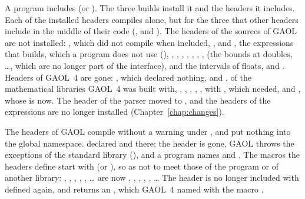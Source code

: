 A program includes  (or ). The three builds
install it and the headers it includes. Each of the installed
headers compiles alone, but for the three that other headers include in the middle
of their code (,
 and
). The headers of the sources of GAOL are not
installed:\newinvfive{} , which did
not compile when included, ,
 and ,
the expressions that  builds, which a program does not
use (), ,
, ,
, ,
, ,
 (the bounds at doubles, \ldots,
which are no longer part of the interface), and the intervals of floats,
 and .
Headers of GAOL~4 are gone: , which declared nothing,
 and , of the
mathematical libraries GAOL~4 was built with, , , ,
, ,  with
, which  needed, and , whose
 is  now. The header of the parser moved
to , and the headers of the expressions are no longer
installed (Chapter~\ref{chap:changes}).

\medskip
The headers of GAOL compile without a warning under , and put nothing into the global namespace.
 declared  and 
there; the header is gone, GAOL throws the exceptions of the standard library
(), and a program names  and
.\newinvfive{} The macros the headers define start with
 (or ), so as not to meet those of the program or of
another library:\newinvfive{} ,
, , ,
, \ldots{} are now
, ,
, , ,
\ldots{} The header  is no longer included
with  defined again, and 
returns an , which GAOL~4 named with the macro
.

